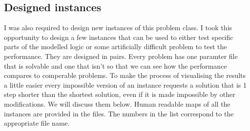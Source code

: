 \documentclass[british]{article}
\begin{document}
\subsection{Designed instances}
I was also required to design new instances of this problem class. I took this opportunity to design a few instances that can be used to either test specific parts of the modelled logic or some artificially difficult problem to test the performance. They are designed in pairs. Every problem has one paramter file that is solvable and one that isn't so that we can see how the performance compares to comperable problems. To make the process of visualising the results a little easier every impossible version of an instance requests a solution that is 1 step shorter than the shortest solution, even if it is made impossible by other modifications. We will discuss them below. Human readable maps of all the instances are provided in the files. The numbers in the list correspond to the appropriate file name. 
\end{document}
